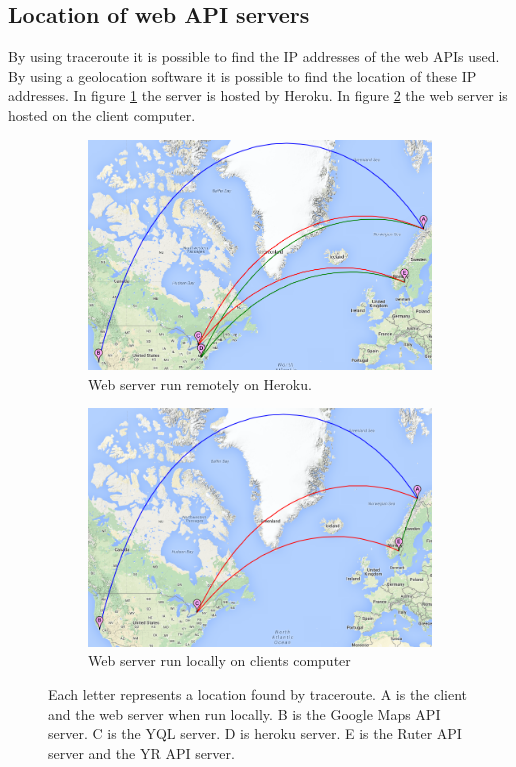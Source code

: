 \documentclass[10pt,a4paper]{article}
\begin{document}
\subsection{Location of web API servers}
By using traceroute it is possible to find the IP addresses of the web APIs used. By using a geolocation software it is possible to find the location of these IP addresses. In figure \ref{fig:traceroute_heroku} the server is hosted by Heroku. In figure \ref{fig:traceroute_localhost} the web server is hosted on the client computer. 

\begin{figure}
\centering
\begin{subfigure}{\textwidth}
\includegraphics[width=\textwidth]{../traceroute/heroku_markers}
\caption{Web server run remotely on Heroku.}
\label{fig:traceroute_heroku}
\end{subfigure}


\begin{subfigure}{\textwidth}
\centering
\includegraphics[width=\textwidth]{../traceroute/localhost_markers}
\caption{Web server run locally on clients computer }
\label{fig:traceroute_localhost}
\end{subfigure}
\caption{Each letter represents a location found by traceroute. A is the client and the web server when run locally. B is the Google Maps API server. C is the YQL server. D is heroku server. E is the Ruter API server and the YR API server.}
\label{fig:traceroute}
\end{figure}
\end{document}
